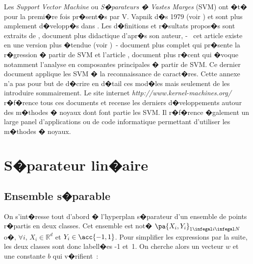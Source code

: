 
\firstpassagedo{}

\firstpassagedo{}



\label{annexe_svm}


Les \emph{Support Vector Machine} ou \emph{S�parateurs � Vastes Marges} (SVM) ont �t� pour la premi�re fois pr�sent�s par V. Vapnik d�s 1979 (voir ) et sont plus amplement d�velopp�s dans . Les d�finitions et r�sultats propos�s sont extraits de , document plus didactique d'apr�s son auteur,  -~ cet article existe en une version plus �tendue (voir )~- document plus complet qui pr�sente la r�gression � partir de SVM et l'article , document plus r�cent qui �voque notamment l'analyse en composantes principales � partir de SVM. Ce dernier document applique les SVM � la reconnaissance de caract�res. Cette annexe n'a pas pour but de d�crire en d�tail ces mod�les mais seulement de les introduire sommairement. Le site internet \textit{http://www.kernel-machines.org/} r�f�rence tous ces documents et recense les derniers d�veloppements autour des m�thodes � noyaux dont font partie les SVM. Il r�f�rence �galement un large panel d'applications ou de code informatique permettant d'utiliser les m�thodes � noyaux.



\section{S�parateur lin�aire}

\label{svm_separateur_lineaire}

\subsection{Ensemble s�parable}


On s'int�resse tout d'abord � l'hyperplan s�parateur d'un ensemble de points r�partis en deux classes. Cet ensemble est not� $\pa{X_i,Y_i}_{1 \infegal i \infegal N}$ o�, $\forall i$, $X_i \in \mathbb{R}^d$ et $Y_i \in \acc{-1,1}$. Pour simplifier les expressions par la suite, les deux classes sont donc labell�es -1 et~1. On cherche alors un vecteur $w$ et une constante $b$ qui v�rifient~:


